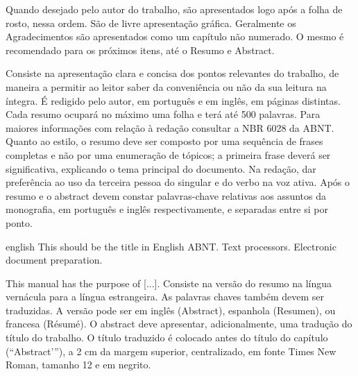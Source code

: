 \documentclass[
	oneside,
	english,brazil,
	mestrado,ppgc]{infufrgs}
\begin{document}
\imprimirfolhaderosto*

\imprimircip

\begin{agradecimentos}
    Quando desejado pelo autor do trabalho, são apresentados logo após a folha
    de rosto, nessa ordem. São de livre apresentação gráfica. Geralmente os
    Agradecimentos são apresentados como um capítulo não numerado. O mesmo é
    recomendado para os próximos itens, até o Resumo e Abstract.
\end{agradecimentos}

\begin{resumo}
    Consiste na apresentação clara e concisa dos pontos relevantes do trabalho,
    de maneira a permitir ao leitor saber da conveniência ou não da sua leitura
    na íntegra. É redigido pelo autor, em português e em inglês, em páginas
    distintas. Cada resumo ocupará no máximo uma folha e terá até 500 palavras.
    Para maiores informações com relação à redação consultar a NBR 6028 da
    ABNT. Quanto ao estilo, o resumo deve ser composto por uma sequência de
    frases completas e não por uma enumeração de tópicos; a primeira frase
    deverá ser significativa, explicando o tema principal do documento. Na
    redação, dar preferência ao uso da terceira pessoa do singular e do verbo
    na voz ativa. Após o resumo e o abstract devem constar palavras-chave
    relativas aos assuntos da monografia, em português e inglês
    respectivamente, e separadas entre si por ponto.
\end{resumo}

\begin{resumoestrangeiro}{english}
	{This should be the title in English}
	{ABNT. Text processors. Electronic document preparation.}

    This manual has the purpose of [...]. Consiste na versão do resumo na
    língua vernácula para a língua estrangeira. As palavras chaves também devem
    ser traduzidas. A versão pode ser em inglês (Abstract), espanhola
    (Resumen), ou francesa (Résumé). O abstract deve apresentar,
    adicionalmente, uma tradução do título do trabalho. O título traduzido é
    colocado antes do título do capítulo (“Abstract’”), a 2 cm da margem
    superior, centralizado, em fonte Times New Roman, tamanho 12 e em negrito.
\end{resumoestrangeiro}

\listoffigures
\cleardoublepage
\end{document}
